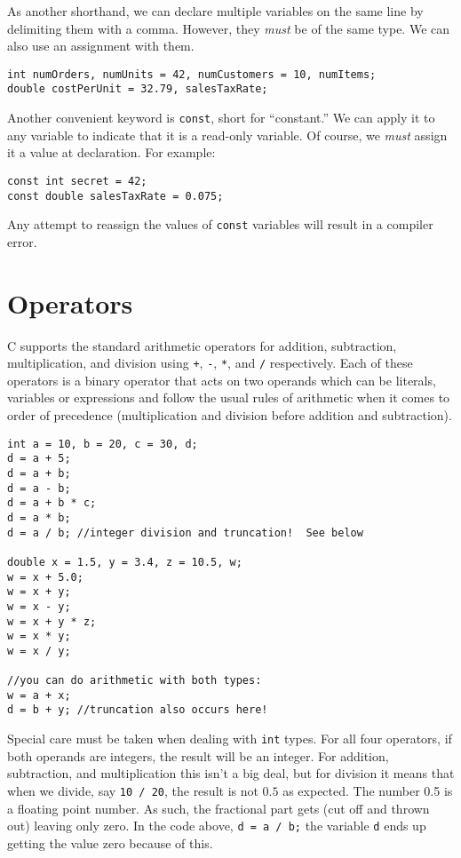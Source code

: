 As another shorthand, we can declare multiple variables on the same line by delimiting
them with a comma.  However, they \emph{must} be of the same type.  We can also 
use an assignment with them. 

\begin{verbatim}
int numOrders, numUnits = 42, numCustomers = 10, numItems;
double costPerUnit = 32.79, salesTaxRate;
\end{verbatim}

Another convenient keyword is \texttt{const}, short for ``constant.''  We can 
apply it to any variable to indicate that it is a read-only variable.  Of course, we
\emph{must} assign it a value at declaration.  For example:

\begin{verbatim}
const int secret = 42;
const double salesTaxRate = 0.075;
\end{verbatim}

Any attempt to reassign the values of \texttt{const} variables will result
in a compiler error.

\section{Operators}

C supports the standard arithmetic operators for addition, subtraction, multiplication, and
division using \texttt{+}, \texttt{-}, \texttt{*}, and
\texttt{/} respectively.  Each of these operators is a binary operator that
acts on two operands which can be literals, variables or expressions and 
follow the usual rules of arithmetic when it comes to order of precedence (multiplication 
and division before addition and subtraction).

\begin{verbatim}
int a = 10, b = 20, c = 30, d;
d = a + 5;
d = a + b;
d = a - b;
d = a + b * c;
d = a * b;
d = a / b; //integer division and truncation!  See below

double x = 1.5, y = 3.4, z = 10.5, w;
w = x + 5.0;
w = x + y;
w = x - y;
w = x + y * z;
w = x * y;
w = x / y;

//you can do arithmetic with both types:
w = a + x;
d = b + y; //truncation also occurs here!
\end{verbatim}

Special care must be taken when dealing with \texttt{int} types.  
For all four operators, if both operands are integers, the result will be an
integer.  For addition, subtraction, and multiplication this isn't a big deal, but
for division it means that when we divide, say \texttt{10 / 20}, the result
is not $0.5$ as expected.  The number 0.5 is a floating point number.  As
such, the fractional part gets  (cut off and thrown out) leaving
only zero.  In the code above, \texttt{d = a / b;} the variable \texttt{d}
ends up getting the value zero because of this.

